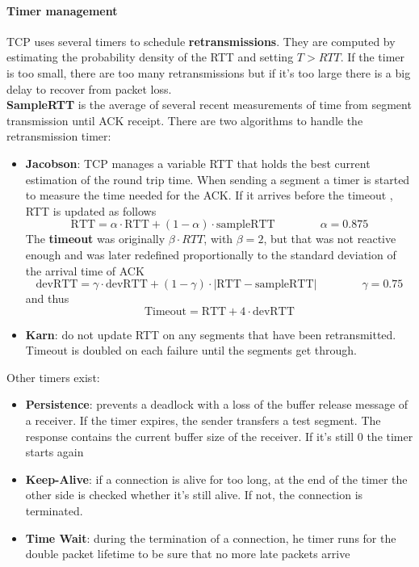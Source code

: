 \paragraph{Timer management} TCP uses several timers to schedule \textbf{retransmissions}. They are computed by estimating the probability density of the RTT and setting $T > RTT$. If the timer is too small, there are too many retransmissions but if it's too large there is a big delay to recover from packet loss.\\
\textbf{SampleRTT} is the average of several recent measurements of time from segment transmission until ACK receipt. There are two algorithms to handle the retransmission timer:
\begin{itemize}
	\item \textbf{Jacobson}: TCP manages a variable RTT that holds the best current estimation of the round trip time. When sending a segment a timer is started to measure the time needed for the ACK. If it arrives before the timeout , RTT is updated as follows
	\begin{equation}
		\text{RTT} = \alpha \cdot \text{RTT} + (1 - \alpha) \cdot \text{sampleRTT} \qquad\qquad \alpha=0.875
	\end{equation}
	The \textbf{timeout} was originally $\beta \cdot RTT$, with $\beta = 2$, but that was not reactive enough and was later redefined proportionally to the standard deviation of the arrival time of ACK
	\begin{equation*}
		\text{devRTT} = \gamma \cdot \text{devRTT} + (1-\gamma) \cdot \lvert \text{RTT} - \text{sampleRTT}\rvert \qquad\qquad \gamma = 0.75
	\end{equation*}
	and thus
	\begin{equation}
		\text{Timeout} = \text{RTT} + 4 \cdot \text{devRTT}
	\end{equation}
	\item \textbf{Karn}: do not update RTT on any segments that have been retransmitted. Timeout is doubled on each failure until the segments get through.
\end{itemize}
Other timers exist:
\begin{itemize}
	\item \textbf{Persistence}: prevents a deadlock with a loss of the buffer release message of a receiver. If the timer expires, the sender transfers a test segment. The response contains the current buffer size of the receiver. If it's still $0$ the timer starts again
	\item \textbf{Keep-Alive}: if a connection is alive for too long, at the end of the timer the other side is checked whether it's still alive. If not, the connection is terminated.
	\item \textbf{Time Wait}: during the termination of a connection, he timer runs for the double packet lifetime to be sure that no more late packets arrive
\end{itemize}

